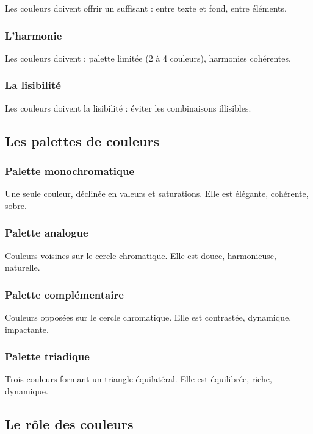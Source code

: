 Les couleurs doivent offrir un  suffisant : entre texte et fond, entre éléments.

\subsubsection{L'harmonie}

Les couleurs doivent  : palette limitée (2 à 4 couleurs), harmonies cohérentes.

\subsubsection{La lisibilité}

Les couleurs doivent  la lisibilité : éviter les combinaisons illisibles.

\subsection{Les palettes de couleurs}

\subsubsection{Palette monochromatique}

Une seule couleur, déclinée en valeurs et saturations. Elle est élégante, cohérente, sobre.

\subsubsection{Palette analogue}

Couleurs voisines sur le cercle chromatique. Elle est douce, harmonieuse, naturelle.

\subsubsection{Palette complémentaire}

Couleurs opposées sur le cercle chromatique. Elle est contrastée, dynamique, impactante.

\subsubsection{Palette triadique}

Trois couleurs formant un triangle équilatéral. Elle est équilibrée, riche, dynamique.

\subsection{Le rôle des couleurs}

